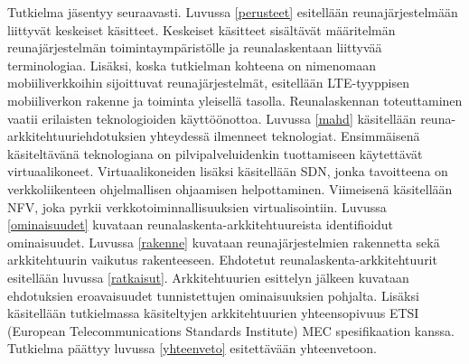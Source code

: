 Tutkielma jäsentyy seuraavasti. Luvussa \ref{perusteet} esitellään reunajärjestelmään liittyvät keskeiset käsitteet. 
Keskeiset käsitteet sisältävät määritelmän reunajärjestelmän toimintaympäristölle ja reunalaskentaan liittyvää terminologiaa.
Lisäksi, koska tutkielman kohteena on nimenomaan mobiiliverkkoihin sijoittuvat reunajärjestelmät, esitellään LTE-tyyppisen mobiiliverkon rakenne ja toiminta yleisellä tasolla.
Reunalaskennan toteuttaminen vaatii erilaisten teknologioiden käyttöönottoa. Luvussa \ref{mahd} käsitellään reuna-arkkitehtuuriehdotuksien yhteydessä ilmenneet teknologiat. Ensimmäisenä käsiteltävänä teknologiana on pilvipalveluidenkin tuottamiseen käytettävät virtuaalikoneet.
Virtuaalikoneiden lisäksi käsitellään SDN, jonka tavoitteena on  verkkoliikenteen ohjelmallisen ohjaamisen helpottaminen. 
Viimeisenä käsitellään NFV, joka pyrkii verkkotoiminnallisuuksien virtualisointiin.
Luvussa \ref{ominaisuudet} kuvataan reunalaskenta\hyp arkkitehtuureista identifioidut ominaisuudet.
Luvussa \ref{rakenne} kuvataan reunajärjestelmien rakennetta sekä arkkitehtuurin vaikutus rakenteeseen.
Ehdotetut reunalaskenta\hyp arkkitehtuurit esitellään luvussa \ref{ratkaisut}. Arkkitehtuurien esittelyn jälkeen kuvataan ehdotuksien eroavaisuudet tunnistettujen ominaisuuksien pohjalta. Lisäksi käsitellään tutkielmassa käsiteltyjen arkkitehtuurien yhteensopivuus ETSI (European Telecommunications Standards Institute) MEC spesifikaation kanssa.
Tutkielma päättyy luvussa \ref{yhteenveto} esitettävään yhteenvetoon.


